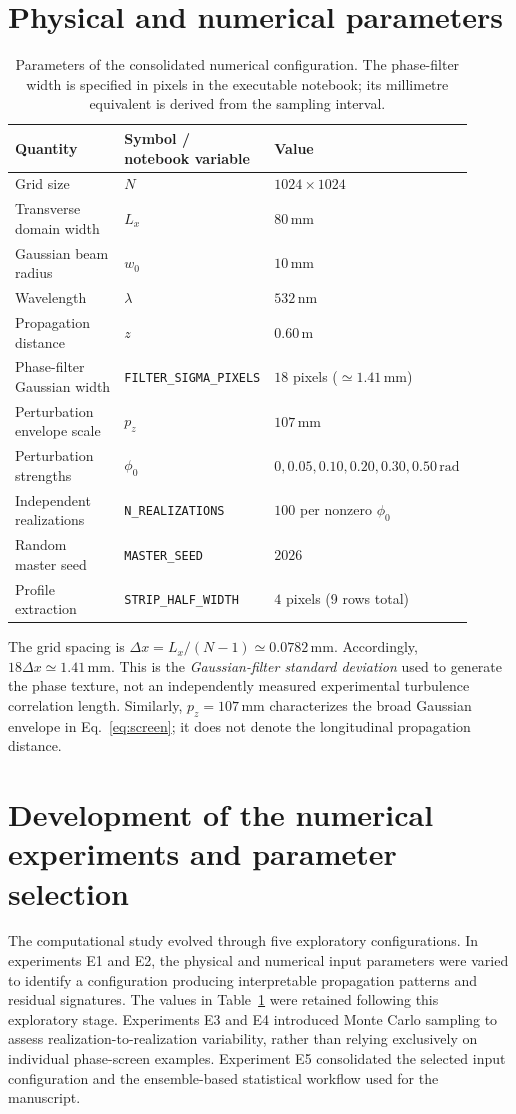 \documentclass[11pt,a4paper]{article}
\begin{document}
\section{Physical and numerical parameters}
\begin{table}[htbp]
\centering\small
\caption{Parameters of the consolidated numerical configuration. The phase-filter width is specified in pixels in the executable notebook; its millimetre equivalent is derived from the sampling interval.}
\label{tab:parameters}
\begin{tabular}{@{}p{0.35\linewidth}p{0.32\linewidth}p{0.24\linewidth}@{}}
\toprule
Quantity & Symbol / notebook variable & Value\\ \midrule
Grid size & $N$ & $1024\times1024$\\
Transverse domain width & $L_x$ & $80\,\mathrm{mm}$\\
Gaussian beam radius & $w_0$ & $10\,\mathrm{mm}$\\
Wavelength & $\lambda$ & $532\,\mathrm{nm}$\\
Propagation distance & $z$ & $0.60\,\mathrm{m}$\\
Phase-filter Gaussian width & \texttt{FILTER\_SIGMA\_PIXELS} & $18$ pixels ($\simeq1.41\,\mathrm{mm}$)\\
Perturbation envelope scale & $p_z$ & $107\,\mathrm{mm}$\\
Perturbation strengths & $\phi_0$ & $0,0.05,0.10,0.20,0.30,0.50\,\mathrm{rad}$\\
Independent realizations & \texttt{N\_REALIZATIONS} & $100$ per nonzero $\phi_0$\\
Random master seed & \texttt{MASTER\_SEED} & $2026$\\
Profile extraction & \texttt{STRIP\_HALF\_WIDTH} & $4$ pixels (9 rows total)\\
\bottomrule
\end{tabular}
\end{table}
The grid spacing is $\Delta x=L_x/(N-1)\simeq0.0782\,\mathrm{mm}$. Accordingly, $18\Delta x\simeq1.41\,\mathrm{mm}$. This is the \emph{Gaussian-filter standard deviation} used to generate the phase texture, not an independently measured experimental turbulence correlation length. Similarly, $p_z=107\,\mathrm{mm}$ characterizes the broad Gaussian envelope in Eq.~\eqref{eq:screen}; it does not denote the longitudinal propagation distance.

\section{Development of the numerical experiments and parameter selection}
The computational study evolved through five exploratory configurations. In experiments E1 and E2, the physical and numerical input parameters were varied to identify a configuration producing interpretable propagation patterns and residual signatures. The values in Table~\ref{tab:parameters} were retained following this exploratory stage. Experiments E3 and E4 introduced Monte Carlo sampling to assess realization-to-realization variability, rather than relying exclusively on individual phase-screen examples. Experiment E5 consolidated the selected input configuration and the ensemble-based statistical workflow used for the manuscript.
\end{document}
